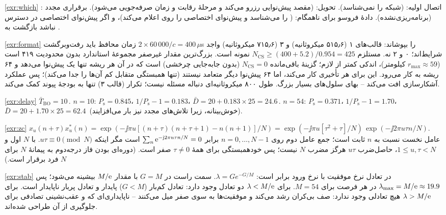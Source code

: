 \documentclass[11pt,a4paper]{article}
\begin{document}
\begin{solutionbox}{\ref{exr:which}}
اتصال اولیه:  (شبکه  را نمی‌شناسد). تحویل:  (مقصد پیش‌نوایی رزرو می‌کند و مرحلهٔ رقابت و
زمان صرفه‌جویی می‌شود). برقراری مجدد :  (برنامه‌ریزی‌نشده). دادهٔ فروسو برای  ناهمگام:
 (  را می‌شناسد و پیش‌نوای اختصاصی را روی  اعلام می‌کند)، و اگر پیش‌نوای اختصاصی
در دسترس نباشد بازگشت به .
\end{solutionbox}

\begin{solutionbox}{\ref{exr:format}}
زمان محافظ باید رفت‌وبرگشت $2\times60\,000/c = 400\,\mu$s را بپوشاند: قالب‌های ۱ (۵۱۵٫۶ میکروثانیه) و ۳ (۷۱۵٫۶
میکروثانیه) واجد شرایط‌اند؛ ۰ و ۲ نه.  مستلزم $N_{\mathrm{CS}} \ge (400+5.2)/0.954 = 425$ نمونه است.
بزرگ‌ترین مقدار غیرصفر مجموعهٔ استاندارد بدون محدودیت ۴۱۹ است ($r_{\max}\approx59$ کیلومتر)، اندکی کمتر از لازم؛ گزینهٔ
باقی‌مانده $N_{\mathrm{CS}} = 0$ (بدون جابه‌جایی چرخشی) است که در آن هر ریشه تنها یک پیش‌نوا می‌دهد و ۶۴ ریشه به کار
می‌رود. این برای هر تأخیری کار می‌کند، اما ۶۴ پیش‌نوا دیگر متعامد نیستند (تنها همبستگی متقابل کم آن‌ها را جدا
می‌کند)؛ پس عملکرد آشکارسازی افت می‌کند -- بهای سلول‌های بسیار بزرگ. طول ۸۰۰ میکروثانیه‌ای دنباله مسئله نیست؛ تکرار
(قالب ۳) تنها به بودجهٔ پیوند کمک می‌کند.
\end{solutionbox}

\begin{solutionbox}{\ref{exr:delay}}
$\bar T_{\mathrm{BO}} = 10$\,. $n=10$: $P_\mathrm{s} = 0.845$، $1/P_\mathrm{s}-1 = 0.183$،
$\bar D = 20 + 0.183\times25 = 24.6$\,. $n=54$: $P_\mathrm{s} = 0.371$، $1/P_\mathrm{s}-1 = 1.70$،
$\bar D = 20 + 1.70\times25 = 62.4$\, (خوش‌بینانه، زیرا تلاش‌های مجدد نیز بار می‌افزایند).
\end{solutionbox}

\begin{solutionbox}{\ref{exr:zc}}
$x_u(n+\tau)x_u^\ast(n) = \exp(-\jj\pi u[(n+\tau)(n+\tau+1) - n(n+1)]/N) =
\exp(-\jj\pi u[\tau^2+\tau]/N)\,\exp(-\jj 2\pi u\tau n/N)$. عامل نخست نسبت به $n$ ثابت است؛ جمع عامل دوم روی
$n = 0,\dots,N-1$ برابر $\sum_n \mathrm{e}^{-\mathrm{j}2\pi u\tau n/N} = 0$ است مگر اینکه $u\tau \equiv 0 \pmod N$. با $N$ اول و
$1\le u,\tau<N$، حاصل‌ضرب $u\tau$ هرگز مضرب $N$ نیست؛ پس خودهمبستگی برای همهٔ $\tau\neq0$ صفر است. (دوره‌ای بودن
فاز درجه‌دوم به پیمانهٔ $N$ برای $N$ فرد برقرار است.)
\end{solutionbox}

\begin{solutionbox}{\ref{exr:stab}}
در تعادل نرخ موفقیت با نرخ ورود برابر است: $\lambda = G e^{-G/M}$. سمت راست در $G = M$ با مقدار $M/\mathrm{e}$ بیشینه می‌شود؛
پس $\lambda_{\max} = M/\mathrm{e} \approx 19.9$  در هر فرصت برای $M=54$. برای $\lambda < M/\mathrm{e}$ دو تعادل وجود دارد: تعادل
کم‌بار ($G<M$) پایدار و تعادل پربار ناپایدار است. برای $\lambda > M/\mathrm{e}$ هیچ تعادلی وجود ندارد: صف بی‌کران رشد می‌کند و
موفقیت‌ها به سوی صفر میل می‌کنند -- ناپایداری‌ای که  و عقب‌نشینی تصادفی برای جلوگیری از آن طراحی شده‌اند.
\end{solutionbox}
\end{document}
